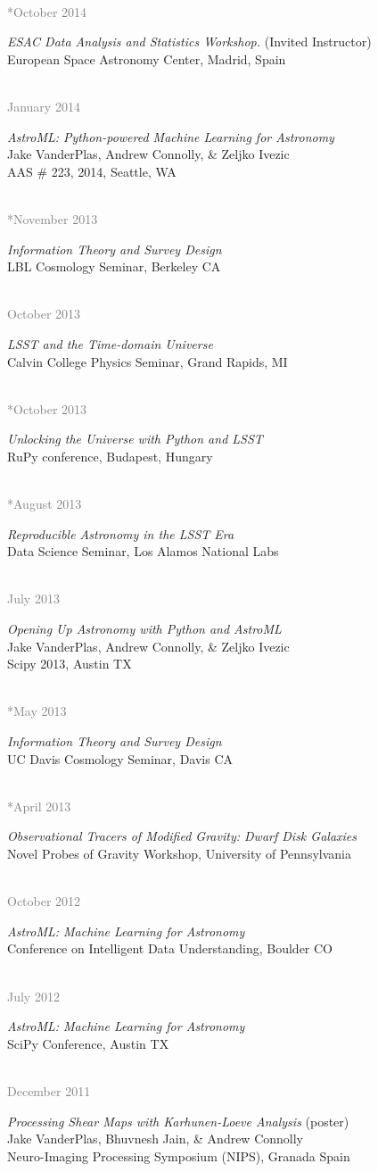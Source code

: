 \documentclass{article} %
\newlength\sidebarwidth
\newcommand{\dateonly}[2][]
	 {\begin{minipage}{\textwidth}
	 \vspace*{.4\baselineskip}
         \nopagebreak\hspace{0in}%
         \nopagebreak\begin{minipage}[t]{\sidebarwidth - .2cm}
         \raggedleft {~}
         {\\[-\baselineskip] \textcolor{gray}{\footnotesize #1}}
	 \end{minipage}%
	 \hfill
	 \begin{minipage}[t]{\linewidth - \sidebarwidth}
	 #2%
	 \end{minipage}%
	 \vspace*{.2\baselineskip plus 1\baselineskip minus
	 .2\baselineskip}%
	 \end{minipage}}
\begin{document}
  \dateonly[**October 2014]{
    {\it ESAC Data Analysis and Statistics Workshop.} (Invited Instructor)\\
    European Space Astronomy Center, Madrid, Spain
  }

  \dateonly[January 2014]{
    {\it AstroML: Python-powered Machine Learning for Astronomy}\\
    Jake VanderPlas, Andrew Connolly, \& Zeljko Ivezic\\
    AAS \# 223, 2014, Seattle, WA
  }

  \dateonly[**November 2013]{
    {\it Information Theory and Survey Design}\\
    LBL Cosmology Seminar, Berkeley CA
  }

  \dateonly[October 2013]{
    {\it LSST and the Time-domain Universe}\\
    Calvin College Physics Seminar, Grand Rapids, MI
  }

  \dateonly[**October 2013]{
    {\it Unlocking the Universe with Python and LSST}\\
    RuPy conference, Budapest, Hungary
  }

  \dateonly[**August 2013]{
    {\it Reproducible Astronomy in the LSST Era}\\
    Data Science Seminar, Los Alamos National Labs
  }

  \dateonly[July 2013]{
    {\it Opening Up Astronomy with Python and AstroML}\\
    Jake VanderPlas, Andrew Connolly, \& Zeljko Ivezic\\
    Scipy 2013, Austin TX
  }

  \dateonly[**May 2013]{
    {\it Information Theory and Survey Design}\\
    UC Davis Cosmology Seminar, Davis CA
  }

  \dateonly[**April 2013]{
    {\it Observational Tracers of Modified Gravity: Dwarf Disk Galaxies}\\
    Novel Probes of Gravity Workshop, University of Pennsylvania
  }

  \dateonly[October 2012]{
    {\it AstroML: Machine Learning for Astronomy}\\
    Conference on Intelligent Data Understanding, Boulder CO
  }

  \dateonly[July 2012]{
    {\it AstroML: Machine Learning for Astronomy}\\
    SciPy Conference, Austin TX
  }

  \dateonly[December 2011]{
    {\it Processing Shear Maps with Karhunen-Loeve Analysis} (poster)\\
    Jake VanderPlas, Bhuvnesh Jain, \& Andrew Connolly\\
    Neuro-Imaging Processing Symposium (NIPS), Granada Spain
  }
\end{document}
